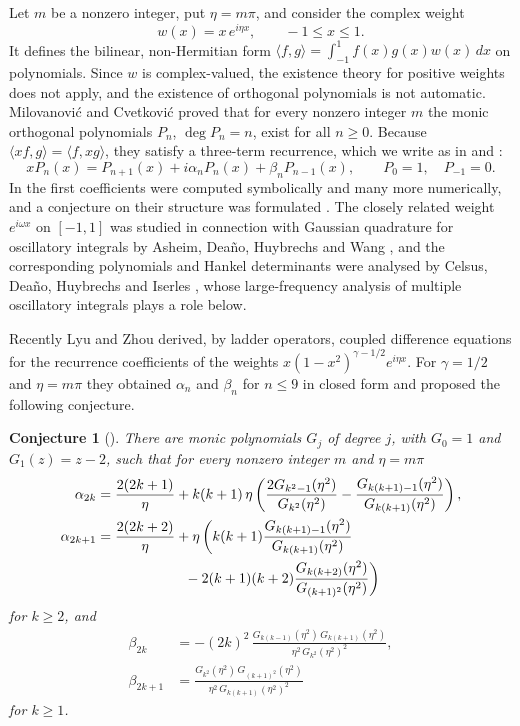 \documentclass[11pt]{amsart}
\newtheorem{conjecture}[theorem]{Conjecture}
\theoremstyle{remark}
\numberwithin{equation}{section}
\begin{document}
Let $m$ be a nonzero integer, put $\eta=m\pi$, and consider the complex weight
\[
w(x)=x\,e^{i\eta x},\qquad -1\le x\le 1 .
\]
It defines the bilinear, non-Hermitian form $\langle f,g\rangle=\int_{-1}^{1}f(x)g(x)w(x)\,dx$ on polynomials. Since $w$ is complex-valued, the existence theory for positive weights does not apply, and the existence of orthogonal polynomials is not automatic. Milovanović and Cvetković \cite[Theorem~2.3]{MC} proved that for every nonzero integer $m$ the monic orthogonal polynomials $P_n$, $\deg P_n=n$, exist for all $n\ge0$. Because $\langle xf,g\rangle=\langle f,xg\rangle$, they satisfy a three-term recurrence, which we write as in \cite[(1.5)]{LZ} and \cite[(3.1)]{MC}:
\begin{equation}\label{eq:recurrence}
xP_n(x)=P_{n+1}(x)+i\alpha_nP_n(x)+\beta_nP_{n-1}(x),\qquad P_0=1,\quad P_{-1}=0 .
\end{equation}
In \cite{MC} the first coefficients were computed symbolically and many more numerically, and a conjecture on their structure was formulated \cite[Conjecture~3.1]{MC}. The closely related weight $e^{i\omega x}$ on $[-1,1]$ was studied in connection with Gaussian quadrature for oscillatory integrals by Asheim, Deaño, Huybrechs and Wang \cite{ADHW}, and the corresponding polynomials and Hankel determinants were analysed by Celsus, Deaño, Huybrechs and Iserles \cite{CDHI}, whose large-frequency analysis of multiple oscillatory integrals plays a role below.

Recently Lyu and Zhou \cite{LZ} derived, by ladder operators, coupled difference equations for the recurrence coefficients of the weights $x(1-x^2)^{\gamma-1/2}e^{i\eta x}$. For $\gamma=1/2$ and $\eta=m\pi$ they obtained $\alpha_n$ and $\beta_n$ for $n\le 9$ in closed form \cite[Corollary~3.8, Table~4]{LZ} and proposed the following conjecture.

\begin{conjecture}[{\cite[Conjecture~3.9]{LZ}}]\label{conj:LZ}
There are monic polynomials $G_j$ of degree $j$, with $G_0=1$ and $G_1(z)=z-2$, such that for every nonzero integer $m$ and $\eta=m\pi$
\begin{align}
\alpha_{2k}&=\frac{2(2k+1)}{\eta}+k(k+1)\,\eta\left(\frac{2G_{k^2-1}(\eta^2)}{G_{k^2}(\eta^2)}-\frac{G_{k(k+1)-1}(\eta^2)}{G_{k(k+1)}(\eta^2)}\right),\label{eq:alpha-even}\\
\alpha_{2k+1}&=\frac{2(2k+2)}{\eta}+\eta\left(k(k+1)\frac{G_{k(k+1)-1}(\eta^2)}{G_{k(k+1)}(\eta^2)}\right.\notag\\
&\qquad\qquad\qquad\left.{}-2(k+1)(k+2)\frac{G_{k(k+2)}(\eta^2)}{G_{(k+1)^2}(\eta^2)}\right)\label{eq:alpha-odd}
\end{align}
for $k\ge2$, and
\begin{equation}\label{eq:beta}
\begin{aligned}
\beta_{2k}&=-(2k)^2\,\frac{G_{k(k-1)}(\eta^2)\,G_{k(k+1)}(\eta^2)}{\eta^2\,G_{k^2}(\eta^2)^2},\\
\beta_{2k+1}&=\frac{G_{k^2}(\eta^2)\,G_{(k+1)^2}(\eta^2)}{\eta^2\,G_{k(k+1)}(\eta^2)^2}
\end{aligned}
\end{equation}
for $k\ge1$.
\end{conjecture}
\end{document}
